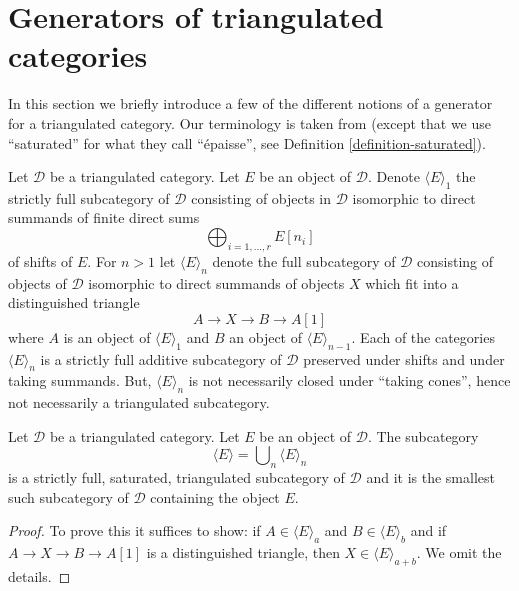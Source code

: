 \section{Generators of triangulated categories}
\label{section-generators}

\noindent
In this section we briefly introduce a few of the different notions
of a generator for a triangulated category. Our terminology is
taken from \cite{BvdB} (except that we use ``saturated'' for what
they call ``\'epaisse'', see Definition \ref{definition-saturated}).

\medskip\noindent
Let $\mathcal{D}$ be a triangulated category. Let $E$ be an object
of $\mathcal{D}$. Denote $\langle E \rangle_1$ the strictly full subcategory
of $\mathcal{D}$ consisting of objects in $\mathcal{D}$ isomorphic to
direct summands of finite direct sums
$$
\bigoplus\nolimits_{i = 1, \ldots, r} E[n_i]
$$
of shifts of $E$. For $n > 1$ let $\langle E \rangle_n$ denote the full
subcategory of $\mathcal{D}$ consisting of objects of $\mathcal{D}$
isomorphic to direct summands of objects $X$ which fit into a distinguished
triangle
$$
A \to X \to B \to A[1]
$$
where $A$ is an object of $\langle E \rangle_1$ and $B$ an object of
$\langle E \rangle_{n - 1}$. Each of
the categories $\langle E \rangle_n$ is a strictly full additive
subcategory of $\mathcal{D}$ preserved under shifts and under taking summands.
But, $\langle E \rangle_n$ is not necessarily closed under
``taking cones'', hence not necessarily a triangulated subcategory.

\begin{lemma}
\label{lemma-find-smallest-containing-E}
Let $\mathcal{D}$ be a triangulated category. Let $E$ be an object
of $\mathcal{D}$. The subcategory
$$
\langle E \rangle = \bigcup\nolimits_n \langle E \rangle_n
$$
is a strictly full, saturated, triangulated subcategory of $\mathcal{D}$
and it is the smallest such subcategory of $\mathcal{D}$ containing
the object $E$.
\end{lemma}

\begin{proof}
To prove this it suffices to show: if $A \in \langle E \rangle_a$
and $B \in \langle E \rangle_b$ and if $A \to X \to B \to A[1]$
is a distinguished triangle, then $X \in \langle E \rangle_{a + b}$.
We omit the details.
\end{proof}

